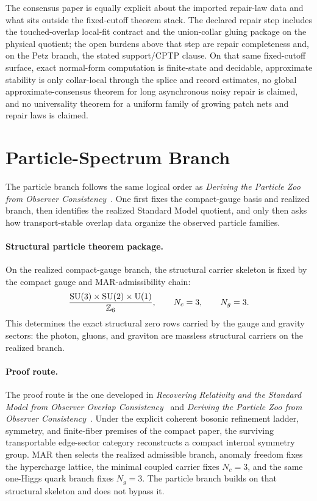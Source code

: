 The consensus paper is equally explicit about the imported repair-law data and what sits
outside the fixed-cutoff theorem stack. The declared repair step includes the
touched-overlap local-fit contract and the union-collar gluing package on the physical quotient;
the open burdens above that step are repair completeness and, on the Petz branch, the stated
support/CPTP clause. On that same fixed-cutoff surface, exact normal-form computation is
finite-state and decidable, approximate stability is only collar-local through the splice and
record estimates, no global approximate-consensus theorem for long asynchronous noisy repair is
claimed, and no universality theorem for a uniform family of growing patch nets and repair laws is
claimed.

\section{Particle-Spectrum Branch}

The particle branch follows the same logical order as
\emph{Deriving the Particle Zoo from Observer Consistency}~\cite{ophparticles}.
One first fixes the compact-gauge basis and realized branch, then identifies the realized
Standard Model quotient, and only then asks how transport-stable overlap data organize the
observed particle families.

\paragraph{Structural particle theorem package.}
On the realized compact-gauge branch, the structural carrier skeleton is fixed by the compact
gauge and MAR-admissibility chain:
\[
\frac{\mathrm{SU}(3)\times\mathrm{SU}(2)\times\mathrm{U}(1)}{\mathbb Z_6},
\qquad
N_c=3,
\qquad
N_g=3.
\]
This determines the exact structural zero rows carried by the gauge and gravity sectors:
the photon, gluons, and graviton are massless structural carriers on the realized branch.

\paragraph{Proof route.}
The proof route is the one developed in
\emph{Recovering Relativity and the Standard Model from Observer Overlap Consistency}~\cite{ophcompact}
and
\emph{Deriving the Particle Zoo from Observer Consistency}~\cite{ophparticles}.
Under the explicit coherent bosonic refinement ladder, symmetry, and finite-fiber premises of the
compact paper, the surviving transportable edge-sector category reconstructs a compact internal
symmetry group. MAR then selects the realized admissible branch, anomaly freedom
fixes the hypercharge lattice, the minimal coupled carrier fixes \(N_c=3\), and the same
one-Higgs quark branch fixes \(N_g=3\). The particle branch builds on that structural skeleton and does not bypass
it.

